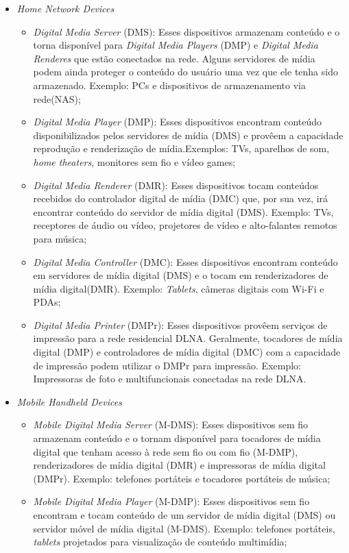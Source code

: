 \begin{itemize}
	\item \emph{Home Network Devices}
	\begin{itemize}
		\item \emph{Digital Media Server} (DMS): Esses dispositivos armazenam conteúdo e o torna disponível para \emph{Digital Media Players} (DMP) e \emph{Digital Media Renderes} que estão conectados na rede. Alguns servidores de mídia podem ainda proteger o conteúdo do usuário uma vez que ele tenha sido armazenado. Exemplo: PCs e dispositivos de armazenamento via rede(NAS);
		\item \emph{Digital Media Player} (DMP): Esses dispositivos encontram conteúdo disponibilizados pelos servidores de mídia (DMS) e provêem a capacidade reprodução e renderização de mídia.Exemplos: TVs, aparelhos de som, \emph{home theaters}, monitores sem fio e vídeo games;
		\item \emph{Digital Media Renderer} (DMR): Esses dispositivos tocam conteúdos recebidos do controlador digital de mídia (DMC) que, por sua vez, irá encontrar conteúdo do servidor de mídia digital (DMS). Exemplo: TVs, receptores de áudio ou vídeo, projetores de vídeo e alto-falantes remotos para música;
		\item \emph{Digital Media Controller} (DMC): Esses dispositivos encontram conteúdo em servidores de mídia digital (DMS) e o tocam em renderizadores de mídia digital(DMR). Exemplo: \emph{Tablets}, câmeras digitais com Wi-Fi e PDAs;
		\item \emph{Digital Media Printer} (DMPr): Esses dispositivos provêem serviços de impressão para a rede residencial DLNA. Geralmente, tocadores de mídia digital (DMP) e controladores de mídia digital (DMC) com a capacidade de impressão podem utilizar o DMPr para impressão. Exemplo: Impressoras de foto e multifuncionais conectadas na rede DLNA.
	\end{itemize}
	\item \emph{Mobile Handheld Devices}
	\begin{itemize}
		\item \emph{Mobile Digital Media Server} (M-DMS): Esses dispositivos sem fio armazenam conteúdo e o tornam disponível para tocadores de mídia digital que tenham acesso à rede sem fio ou com fio (M-DMP), renderizadores de mídia digital (DMR) e impressoras de mídia digital (DMPr). Exemplo: telefones portáteis e tocadores portáteis de música;
		\item \emph{Mobile Digital Media Player} (M-DMP): Esses dispositivos sem fio encontram e tocam conteúdo de um servidor de mídia digital (DMS) ou servidor móvel de mídia digital (M-DMS). Exemplo: telefones portáteis, \emph{tablets} projetados para visualização de conteúdo multimídia;

\end{itemize}
\end{itemize}
